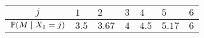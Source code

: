 \begin{exercisePage}
\begin{enumerate}[wide, leftmargin=*, label=(zu \alph*)]
		\begin{center}
			\begin{tabular}{c||C|C|C|C|C|C}
				$j$ & $1$ & $2$ & $3$ & $4$ & $5$ & $6$ \\
				\hline
				$\P(M \mid X_1 = j)$ & $3.5$ & $3.67$ & $4$ & $4.5$ & $5.17$ & $6$ \\
			\end{tabular}
		\end{center}
	\end{enumerate}

\end{exercisePage}